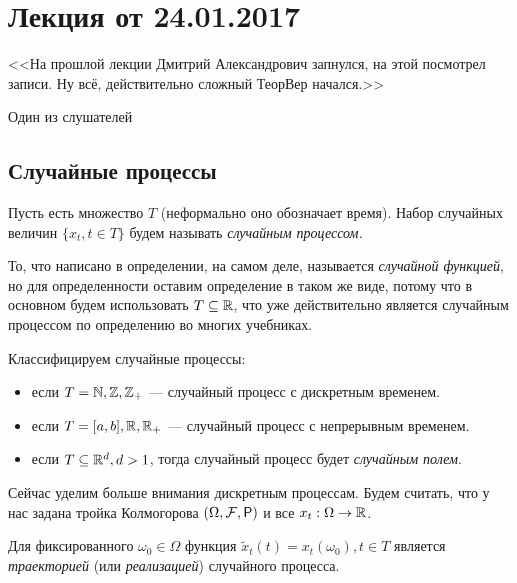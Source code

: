 \section{Лекция от 24.01.2017}

\epigraph{<<На прошлой лекции Дмитрий Александрович запнулся, на этой посмотрел записи. Ну всё, действительно сложный ТеорВер начался.>>}
{Один из слушателей}

\subsection{Случайные процессы}

\begin{definition}
  Пусть есть множество $T$ (неформально оно обозначает время). Набор случайных
  величин $\{x_t, t \in T\}$ будем называть \emph{случайным процессом.}
\end{definition}

\begin{remark}
  То, что написано в определении, на самом деле, называется \emph{случайной функцией},
  но для определенности оставим определение в таком же виде, потому что в основном
  будем использовать $T \subseteq \mathbb{R}$, что уже действительно является случайным
  процессом по определению во многих учебниках.
\end{remark}

\begin{definition}
  Классифицируем случайные процессы:
  \begin{itemize}
    \item если $T = \mathbb{N}, \mathbb{Z}, \mathbb{Z}_{+}$ --- случайный процесс с дискретным временем.
    \item если $T = [a, b], \mathbb{R}, \mathbb{R}_{+}$ --- случайный процесс с непрерывным
    временем.
    \item если $T \subseteq \mathbb{R}^d, d > 1$, тогда случайный процесс будет \textit{случайным
    полем}.
  \end{itemize}
\end{definition}

Сейчас уделим больше внимания дискретным процессам. Будем считать, что у нас
задана тройка Колмогорова $(\Omega, \F, \Pr)$ и все $x_t: \Omega \to \mathbb{R}$.

\begin{definition}
  Для фиксированного $\omega_0 \in \Omega$ функция $\tilde{x}_t(t) = x_t(\omega_0), t \in T$
  является \emph{траекторией} (или \emph{реализацией}) случайного процесса.
\end{definition}

